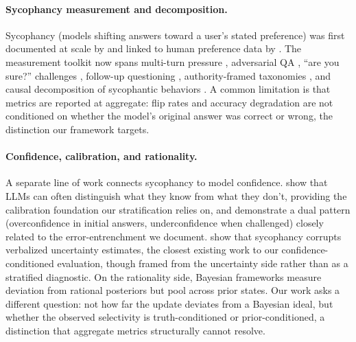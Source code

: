 \documentclass[11pt]{article}
\begin{document}
\paragraph{Sycophancy measurement and decomposition.}
Sycophancy (models shifting answers toward a user's stated preference) was first documented at scale by \citet{perez2022discovering} and linked to human preference data by \citet{sharma2023sycophancy}.
The measurement toolkit now spans multi-turn pressure \citep{hong2025multiturn}, adversarial QA \citep{zhang2025sycophancypressure}, ``are you sure?'' challenges \citep{laban2024flipflop}, follow-up questioning \citep{xie2024askagain}, authority-framed taxonomies \citep{celebi2025parrot}, and causal decomposition of sycophantic behaviors \citep{vennemeyer2025causal}.
A common limitation is that metrics are reported at aggregate: flip rates and accuracy degradation are not conditioned on whether the model's original answer was correct or wrong, the distinction our framework targets.

\paragraph{Confidence, calibration, and rationality.}
A separate line of work connects sycophancy to model confidence.
\citet{kadavath2022language} show that LLMs can often distinguish what they know from what they don't, providing the calibration foundation our stratification relies on, and \citet{kumaran2025confidence} demonstrate a dual pattern (overconfidence in initial answers, underconfidence when challenged) closely related to the error-entrenchment we document.
\citet{sicilia2025sycophancyuncertainty} show that sycophancy corrupts verbalized uncertainty estimates, the closest existing work to our confidence-conditioned evaluation, though framed from the uncertainty side rather than as a stratified diagnostic.
On the rationality side, Bayesian frameworks \citep{atwell2025basil,wilie2024belief,imran2025bayesian} measure deviation from rational posteriors but pool across prior states.
Our work asks a different question: not how far the update deviates from a Bayesian ideal, but whether the observed selectivity is truth-conditioned or prior-conditioned, a distinction that aggregate metrics structurally cannot resolve.
\end{document}
